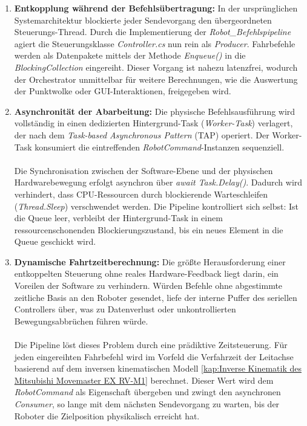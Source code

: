 \begin{enumerate}
	\item \textbf{Entkopplung während der Befehlsübertragung:} 
	In der ursprünglichen Systemarchitektur blockierte jeder Sendevorgang den übergeordneten Steuerungs-Thread. Durch die Implementierung der \textit{Robot\_Befehlspipeline} agiert die Steuerungsklasse \textit{Controller.cs} nun rein als \textit{Producer}. Fahrbefehle werden als Datenpakete mittels der Methode \textit{Enqueue()} in die \textit{BlockingCollection} eingereiht. Dieser Vorgang ist nahezu latenzfrei, wodurch der Orchestrator unmittelbar für weitere Berechnungen, wie die Auswertung der Punktwolke oder GUI-Interaktionen, freigegeben wird.
	\item \textbf{Asynchronität der Abarbeitung:}
	Die physische Befehlsausführung wird vollständig in einen dedizierten Hintergrund-Task (\textit{Worker-Task}) verlagert, der nach dem \textit{Task-based Asynchronous Pattern} (TAP) operiert. Der Worker-Task konsumiert die eintreffenden \textit{RobotCommand}-Instanzen sequenziell. \\
	\\Die Synchronisation zwischen der Software-Ebene und der physischen Hardwarebewegung erfolgt asynchron über \textit{await Task.Delay()}. Dadurch wird verhindert, dass CPU-Ressourcen durch blockierende Warteschleifen (\textit{Thread.Sleep}) verschwendet werden. Die Pipeline kontrolliert sich selbst: Ist die Queue leer, verbleibt der Hintergrund-Task in einem ressourcenschonenden Blockierungszustand, bis ein neues Element in die Queue geschickt wird.
	\item \textbf{Dynamische Fahrtzeitberechnung:}
	Die größte Herausforderung einer entkoppelten Steuerung ohne reales Hardware-Feedback liegt darin, ein Voreilen der Software zu verhindern. Würden Befehle ohne abgestimmte zeitliche Basis an den Roboter gesendet, liefe der interne Puffer des seriellen Controllers über, was zu Datenverlust oder unkontrollierten Bewegungsabbrüchen führen würde.\\
	\\Die Pipeline löst dieses Problem durch eine prädiktive Zeitsteuerung. Für jeden eingereihten Fahrbefehl wird im Vorfeld die Verfahrzeit der Leitachse basierend auf dem inversen kinematischen Modell \ref{kap:Inverse Kinematik des Mitsubishi Movemaster EX RV-M1} berechnet. Dieser Wert wird dem \textit{RobotCommand} als Eigenschaft übergeben und zwingt den asynchronen \textit{Consumer}, so lange mit dem nächsten Sendevorgang zu warten, bis der Roboter die Zielposition physikalisch erreicht hat.
\end{enumerate}

